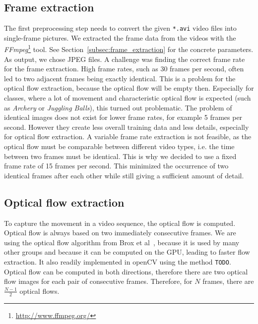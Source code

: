 \subsection{Frame extraction}
The first preprocessing step needs to convert the given \texttt{*.avi} video files into single-frame pictures.
We extracted the frame data from the videos with the \emph{FFmpeg}\footnote{\url{http://www.ffmpeg.org/}} tool.
See Section~\ref{subsec:frame_extraction} for the concrete parameters.
As output, we chose JPEG files.
A challenge was finding the correct frame rate for the frame extraction.
High frame rates, such as 30 frames per second, often led to two adjacent frames being exactly identical.
This is a problem for the optical flow extraction, because the optical flow will be empty then.
Especially for classes, where a lot of movement and characteristic optical flow is expected (such as \emph{Archery} or \emph{Juggling Balls}), this turned out problematic.
The problem of identical images does not exist for lower frame rates, for example 5 frames per second.
However they create less overall training data and less details, especially for optical flow extraction.
A variable frame rate extraction is not feasible, as the optical flow must be comparable between different video types, i.e. the time between two frames must be identical.
This is why we decided to use a fixed frame rate of 15 frames per second.
This minimized the occurrence of two identical frames after each other while still giving a sufficient amount of detail.

\subsection{Optical flow extraction}
To capture the movement in a video sequence, the optical flow is computed.
Optical flow is always based on two immediately consecutive frames.
We are using the optical flow algorithm from Brox et al~\cite{brox2004high}, because it is used by many other groups and because it can be computed on the GPU, leading to faster flow extraction.
It also readily implemented in openCV using the method \texttt{TODO}.
Optical flow can be computed in both directions, therefore there are two optical flow images for each pair of consecutive frames.
Therefore, for $N$ frames, there are $\frac{N - 1}{2}$ optical flows.

